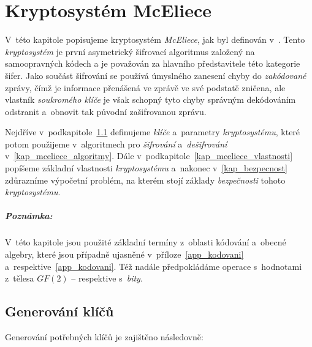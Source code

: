 \documentclass[thesis=M,czech,hidelinks]{FITthesis}[2012/06/26]
\newcommand{\0}{{\textcolor[gray]{0.75}{0}}}
\begin{document}
\chapter{Kryptosystém McEliece}\label{kap_mceliece}

V~této kapitole popisujeme kryptosystém \emph{McEliece}, jak byl definován
v~\cite{McEliece}.  Tento \emph{kryptosystém} je první asymetrický šifrovací
algoritmus založený na samoopravných kódech a je považován za hlavního
představitele této kategorie šifer. Jako součást šifrování se používá úmyslného
zanesení chyby do \emph{zakódované} zprávy, čímž je informace přenášená ve
zprávě ve své podstatě zničena, ale vlastník \emph{soukromého klíče} je však
schopný tyto chyby správným dekódováním odstranit a~obnovit tak původní
zašifrovanou zprávu.

Nejdříve v~podkapitole~\ref{kap_generovani_klicu} definujeme \emph{klíče}
a~parametry \emph{kryptosystému}, které potom použijeme v~algoritmech pro
\emph{šifrování} a~\emph{dešifrování} v~\ref{kap_mceliece_algoritmy}. Dále
v~podkapitole~\ref{kap_mceliece_vlastnosti} popíšeme základní vlastnosti
\emph{kryptosystému} a~nakonec v~\ref{kap_bezpecnost} zdůrazníme výpočetní
problém, na kterém stojí základy \emph{bezpečnosti} tohoto \emph{kryptosystému}.

\vfil


\paragraph{Poznámka:} V~této kapitole jsou použité základní termíny z~oblasti
kódování a~obecné algebry, které jsou případně ujasněné
v~příloze~\ref{app_kodovani} a~respektive~\ref{app_kodovani}. Též nadále
předpokládáme operace s~hodnotami z~tělesa $GF(2)$ -- respektive s~\emph{bity}.

\vfil


\section{Generování klíčů}\label{kap_generovani_klicu}

Generování potřebných klíčů je zajištěno následovně:
\end{document}
